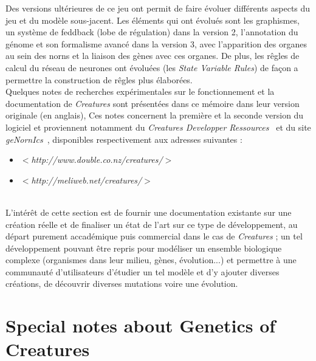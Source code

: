 \documentclass[11pt,twoside,a4paper]{article}
\begin{document}
Des versions ult{\'e}rieures de ce jeu ont permit de faire {\'e}voluer diff{\'e}rents aspects du jeu et du mod{\`e}le sous-jacent. Les {\'e}l{\'e}ments qui ont {\'e}volu{\'e}s sont les graphismes, un syst{\`e}me de feddback (lobe de r{\'e}gulation) dans la version 2, l'annotation du g{\'e}nome et son formalisme avanc{\'e} dans la version 3, avec l'apparition des organes au sein des norns et la liaison des g{\`e}nes avec ces organes. De plus, les r{\^e}gles de calcul du r{\'e}seau de neurones ont {\'e}volu{\'e}es (les \emph{State Variable Rules}) de fa\c{c}on a permettre la construction de r{\^e}gles plus {\'e}labor{\'e}es.~\\

Quelques notes de recherches exp{\'e}rimentales sur le fonctionnement et la documentation de  \textit{Creatures} sont pr{\'e}sent{\'e}es dans ce m{\'e}moire dans leur version originale (en anglais), Ces notes concernent la premi{\`e}re et la seconde version du logiciel et proviennent notamment du \emph{Creatures Developper Ressources}~\cite{CreaturesDeveloperRessources} et du site \emph{geNornIcs}~\cite{genornics}, disponibles respectivement aux adresses suivantes : 
\begin{itemize}
	\item $<$\textit{http://www.double.co.nz/creatures/}$>$~\cite{CreaturesDeveloperRessources}
	\item $<$\textit{http://meliweb.net/creatures/}$>$~\cite{genornics}
\end{itemize}~\\

L'int{\'e}r{\^e}t de cette section est de fournir une documentation existante sur une cr{\'e}ation r{\'e}elle et de finaliser un {\'e}tat de l'art sur ce type de d{\'e}veloppement, au d{\'e}part purement accad{\'e}mique puis commercial dans le cas de \emph{Creatures} ; un tel d{\'e}veloppement pouvant {\^e}tre repris pour mod{\'e}liser un ensemble biologique complexe (organismes dans leur milieu, g{\`e}nes, {\'e}volution...) et permettre {\`a} une communaut{\'e} d'utilisateurs d'{\'e}tudier un tel mod{\`e}le et d'y ajouter diverses cr{\'e}ations, de d{\'e}couvrir diverses mutations voire une {\'e}volution.~\\

\clearpage

\section{Special notes about Genetics of Creatures}
\end{document}
